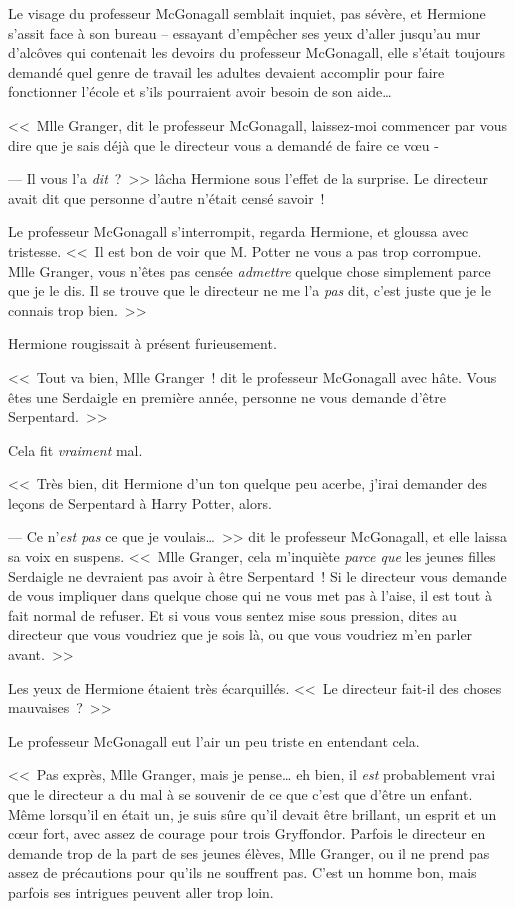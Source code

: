 Le visage du professeur McGonagall semblait inquiet, pas sévère, et Hermione s'assit face à son bureau -- essayant d'empêcher ses yeux d'aller jusqu'au mur d'alcôves qui contenait les devoirs du professeur McGonagall, elle s'était toujours demandé quel genre de travail les adultes devaient accomplir pour faire fonctionner l'école et s'ils pourraient avoir besoin de son aide…

<<~Mlle Granger, dit le professeur McGonagall, laissez-moi commencer par vous dire que je sais déjà que le directeur vous a demandé de faire ce vœu -

--- Il vous l'a \emph{dit}~?~>> lâcha Hermione sous l'effet de la surprise. Le directeur avait dit que personne d'autre n'était censé savoir~!

Le professeur McGonagall s'interrompit, regarda Hermione, et gloussa avec tristesse. <<~Il est bon de voir que M. Potter ne vous a pas trop corrompue. Mlle Granger, vous n'êtes pas censée \emph{admettre} quelque chose simplement parce que je le dis. Il se trouve que le directeur ne me l'a \emph{pas} dit, c'est juste que je le connais trop bien.~>>

Hermione rougissait à présent furieusement.

<<~Tout va bien, Mlle Granger~! dit le professeur McGonagall avec hâte. Vous êtes une Serdaigle en première année, personne ne vous demande d'être Serpentard.~>>

Cela fit \emph{vraiment} mal.

<<~Très bien, dit Hermione d'un ton quelque peu acerbe, j'irai demander des leçons de Serpentard à Harry Potter, alors.

--- Ce n'\emph{est pas} ce que je voulais…~>> dit le professeur McGonagall, et elle laissa sa voix en suspens. <<~Mlle Granger, cela m'inquiète \emph{parce que} les jeunes filles Serdaigle ne devraient pas avoir à être Serpentard~! Si le directeur vous demande de vous impliquer dans quelque chose qui ne vous met pas à l'aise, il est tout à fait normal de refuser. Et si vous vous sentez mise sous pression, dites au directeur que vous voudriez que je sois là, ou que vous voudriez m'en parler avant.~>>

Les yeux de Hermione étaient très écarquillés. <<~Le directeur fait-il des choses mauvaises~?~>>

Le professeur McGonagall eut l'air un peu triste en entendant cela.

<<~Pas exprès, Mlle Granger, mais je pense… eh bien, il \emph{est} probablement vrai que le directeur a du mal à se souvenir de ce que c'est que d'être un enfant. Même lorsqu'il en était un, je suis sûre qu'il devait être brillant, un esprit et un cœur fort, avec assez de courage pour trois Gryffondor. Parfois le directeur en demande trop de la part de ses jeunes élèves, Mlle Granger, ou il ne prend pas assez de précautions pour qu'ils ne souffrent pas. C'est un homme bon, mais parfois ses intrigues peuvent aller trop loin.

